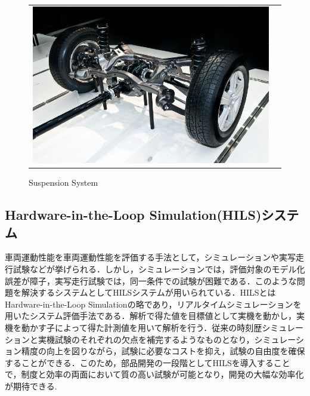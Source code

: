\documentclass[a4paper,12pt]{article_vdlab_sotsuron}
\begin{document}
\vspace{10mm}
\begin{figure}[h!]
  \begin{tabular}{cc}
    \begin{minipage}{1.0\hsize}
      \begin{center}
	\includegraphics[scale = 1.0]{figure/pic_suspension.eps}
	\caption{Suspension System\cite{pic_sus.net}}
	\label{fig:suspension}
      \end{center}
     \end{minipage}
    \end{tabular}
\end{figure}

\newpage
\subsection{Hardware-in-the-Loop Simulation(HILS)システム}
車両運動性能を車両運動性能を評価する手法として，シミュレーションや実写走行試験などが挙げられる．しかし，シミュレーションでは，評価対象のモデル化誤差が障子，実写走行試験では，同一条件での試験が困難である．このような問題を解決するシステムとしてHILSシステムが用いられている\cite{exp_hils1}．HILSとはHardware-in-the-Loop Simulationの略であり，リアルタイムシミュレーションを用いたシステム評価手法である．解析で得た値を目標値として実機を動かし，実機を動かす子によって得た計測値を用いて解析を行う．従来の時刻歴シミュレーションと実機試験のそれぞれの欠点を補完するようなものとなり，シミュレーション精度の向上を図りながら，試験に必要なコストを抑え，試験の自由度を確保することができる．このため，部品開発の一段階としてHILSを導入することで，制度と効率の両面において質の高い試験が可能となり，開発の大幅な効率化が期待できる\cite{exp_hils2}.
\end{document}
